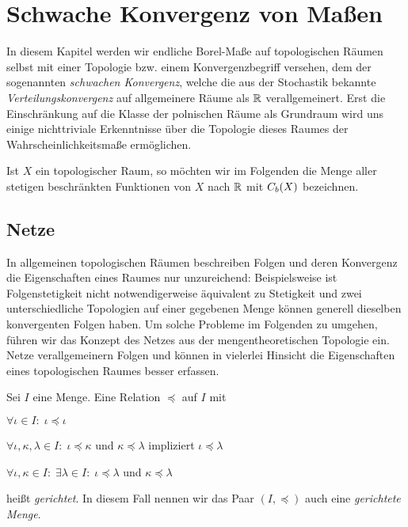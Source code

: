 \documentclass[../main/main.tex]{subfiles}
\begin{document}
	
	\section{Schwache Konvergenz von Maßen}
	
	In diesem Kapitel werden wir endliche Borel-Maße auf topologischen Räumen selbst
	mit einer Topologie bzw. einem Konvergenzbegriff versehen, dem der sogenannten \emph{schwachen Konvergenz}, 
	welche die aus der Stochastik bekannte \emph{Verteilungskonvergenz} auf allgemeinere Räume als $\mathbb{R}$ verallgemeinert. 
	Erst die Einschränkung auf die Klasse der polnischen Räume als Grundraum wird uns einige nichttriviale Erkenntnisse 
	über die Topologie dieses Raumes der Wahrscheinlichkeitsmaße ermöglichen.
	
	Ist $X$ ein topologischer Raum, so möchten wir im Folgenden die Menge aller stetigen beschränkten Funktionen von $X$ 
	nach $\mathbb{R}$ mit $C_b(X)$ bezeichnen.
	
	\subsection{Netze}
	
	In allgemeinen topologischen Räumen beschreiben Folgen und deren Konvergenz die Eigenschaften eines Raumes nur unzureichend:
	Beispielsweise ist Folgenstetigkeit nicht notwendigerweise äquivalent zu Stetigkeit und zwei unterschiedliche Topologien auf einer 
	gegebenen Menge können generell dieselben konvergenten Folgen haben. Um solche Probleme im Folgenden zu umgehen, führen wir das
	Konzept des Netzes aus der mengentheoretischen Topologie ein. Netze verallgemeinern Folgen und können in vielerlei Hinsicht die 
	Eigenschaften eines topologischen Raumes besser erfassen.
	
	\begin{Definition}
		Sei $I$ eine Menge. Eine Relation $\preceq$ auf $I$ mit
		\begin{enumeratethm}
			\item $\forall \iota \in I: \; \iota \preceq \iota$
			\item $\forall \iota, \kappa, \lambda \in I: \; \iota \preceq \kappa$ und $\kappa \preceq \lambda$ impliziert $\iota \preceq \lambda$
			\item $\forall \iota, \kappa \in I: \; \exists \lambda \in I: \; \iota \preceq \lambda$ und $\kappa \preceq \lambda$
		\end{enumeratethm}
		heißt \emph{gerichtet}. In diesem Fall nennen wir das Paar $(I, \preceq)$ auch eine \emph{gerichtete Menge}.
	\end{Definition}
	
\end{document}
